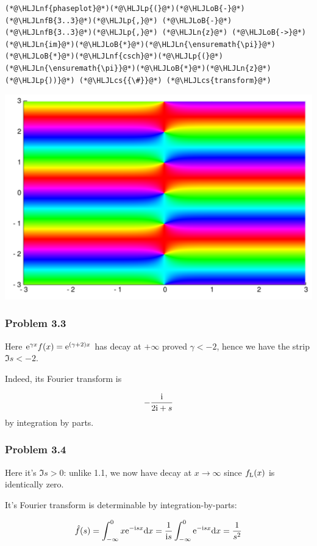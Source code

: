 \documentclass[12pt,a4paper]{article}
\newcommand{\HLJLn}[1]{#1}
\newcommand{\HLJLnf}[1]{\textcolor[RGB]{66,102,213}{#1}}
\newcommand{\HLJLnfB}[1]{\textcolor[RGB]{59,151,46}{#1}}
\newcommand{\HLJLoB}[1]{\textcolor[RGB]{102,102,102}{\textbf{#1}}}
\newcommand{\HLJLp}[1]{#1}
\newcommand{\HLJLcs}[1]{\textcolor[RGB]{153,153,119}{\textit{#1}}}
\def\D{ {\rm d} }
\def\I{ {\rm i} }
\def\E{ {\rm e} }
\def\dx{\D x}
\begin{document}
\begin{lstlisting}
(*@\HLJLnf{phaseplot}@*)(*@\HLJLp{(}@*)(*@\HLJLoB{-}@*)(*@\HLJLnfB{3..3}@*)(*@\HLJLp{,}@*) (*@\HLJLoB{-}@*)(*@\HLJLnfB{3..3}@*)(*@\HLJLp{,}@*) (*@\HLJLn{z}@*) (*@\HLJLoB{->}@*) (*@\HLJLn{im}@*)(*@\HLJLoB{*}@*)(*@\HLJLn{\ensuremath{\pi}}@*)(*@\HLJLoB{*}@*)(*@\HLJLnf{csch}@*)(*@\HLJLp{(}@*)(*@\HLJLn{\ensuremath{\pi}}@*)(*@\HLJLoB{*}@*)(*@\HLJLn{z}@*)(*@\HLJLp{))}@*) (*@\HLJLcs{{\#}}@*) (*@\HLJLcs{transform}@*)
\end{lstlisting}

\includegraphics[width=\linewidth]{figures/Solutions4_10_1.pdf}

\subsubsection{Problem 3.3}
Here $\E^{\gamma x } f(x) = \E^{(\gamma+2) x}$ has decay at $+\infty$ proved $\gamma < -2$, hence we have the strip $\Im s < -2$.

Indeed, its Fourier transform is 

\[
-{\I \over 2 \I +s}
\]
by integration by parts.

\subsubsection{Problem 3.4}
Here it's $\Im s > 0$: unlike 1.1, we now have decay at $x \rightarrow \infty$ since $f_{\rm L}(x)$ is identically zero.

It's Fourier transform is determinable by integration-by-parts:

\[
\hat f(s) = \int_{-\infty}^0 x \E^{-\I s x} \dx = {1 \over \I s} \int_{-\infty}^0\E^{-\I s x} \dx = {1 \over s^2}
\]
\end{document}
